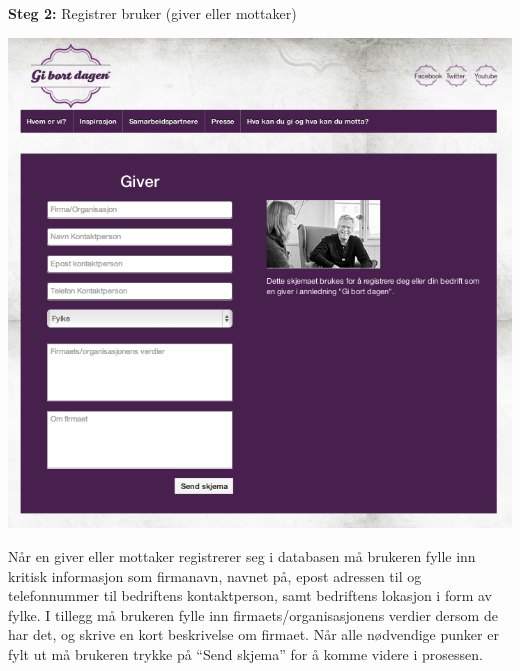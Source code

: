 {\bf Steg 2:} Registrer bruker (giver eller mottaker)
\begin{center}
\includegraphics[clip=true, width=1 \textwidth,
trim=0cm 0cm 0cm 0cm]{registreringavbruker.jpg}
\label{fig:registrering}
\end{center}

Når en giver eller mottaker registrerer seg i databasen må brukeren fylle inn kritisk informasjon som firmanavn, navnet på, epost adressen til og telefonnummer til bedriftens kontaktperson, samt bedriftens lokasjon i form av fylke. I tillegg må brukeren fylle inn firmaets/organisasjonens verdier dersom de har det, og skrive en kort beskrivelse om firmaet. Når alle nødvendige punker er fylt ut må brukeren trykke på ``Send skjema'' for å komme videre i prosessen.\\

\newpage

